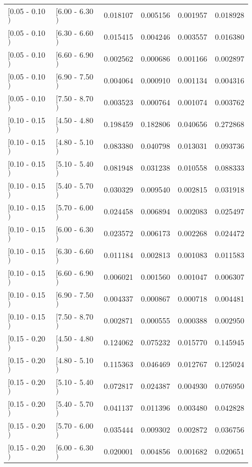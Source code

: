\begin{longtable}{| l | l | r | r | r | r |}
$[$0.05 - 0.10$)$ & $[$6.00 - 6.30$)$ & 0.018107 & 0.005156 & 0.001957 & 0.018928 \\
$[$0.05 - 0.10$)$ & $[$6.30 - 6.60$)$ & 0.015415 & 0.004246 & 0.003557 & 0.016380 \\
$[$0.05 - 0.10$)$ & $[$6.60 - 6.90$)$ & 0.002562 & 0.000686 & 0.001166 & 0.002897 \\
$[$0.05 - 0.10$)$ & $[$6.90 - 7.50$)$ & 0.004064 & 0.000910 & 0.001134 & 0.004316 \\
$[$0.05 - 0.10$)$ & $[$7.50 - 8.70$)$ & 0.003523 & 0.000764 & 0.001074 & 0.003762 \\
$[$0.10 - 0.15$)$ & $[$4.50 - 4.80$)$ & 0.198459 & 0.182806 & 0.040656 & 0.272868 \\
$[$0.10 - 0.15$)$ & $[$4.80 - 5.10$)$ & 0.083380 & 0.040798 & 0.013031 & 0.093736 \\
$[$0.10 - 0.15$)$ & $[$5.10 - 5.40$)$ & 0.081948 & 0.031238 & 0.010558 & 0.088333 \\
$[$0.10 - 0.15$)$ & $[$5.40 - 5.70$)$ & 0.030329 & 0.009540 & 0.002815 & 0.031918 \\
$[$0.10 - 0.15$)$ & $[$5.70 - 6.00$)$ & 0.024458 & 0.006894 & 0.002083 & 0.025497 \\
$[$0.10 - 0.15$)$ & $[$6.00 - 6.30$)$ & 0.023572 & 0.006173 & 0.002268 & 0.024472 \\
$[$0.10 - 0.15$)$ & $[$6.30 - 6.60$)$ & 0.011184 & 0.002813 & 0.001083 & 0.011583 \\
$[$0.10 - 0.15$)$ & $[$6.60 - 6.90$)$ & 0.006021 & 0.001560 & 0.001047 & 0.006307 \\
$[$0.10 - 0.15$)$ & $[$6.90 - 7.50$)$ & 0.004337 & 0.000867 & 0.000718 & 0.004481 \\
$[$0.10 - 0.15$)$ & $[$7.50 - 8.70$)$ & 0.002871 & 0.000555 & 0.000388 & 0.002950 \\
$[$0.15 - 0.20$)$ & $[$4.50 - 4.80$)$ & 0.124062 & 0.075232 & 0.015770 & 0.145945 \\
$[$0.15 - 0.20$)$ & $[$4.80 - 5.10$)$ & 0.115363 & 0.046469 & 0.012767 & 0.125024 \\
$[$0.15 - 0.20$)$ & $[$5.10 - 5.40$)$ & 0.072817 & 0.024387 & 0.004930 & 0.076950 \\
$[$0.15 - 0.20$)$ & $[$5.40 - 5.70$)$ & 0.041137 & 0.011396 & 0.003480 & 0.042828 \\
$[$0.15 - 0.20$)$ & $[$5.70 - 6.00$)$ & 0.035444 & 0.009302 & 0.002872 & 0.036756 \\
$[$0.15 - 0.20$)$ & $[$6.00 - 6.30$)$ & 0.020001 & 0.004856 & 0.001682 & 0.020651 \\

\end{longtable}
